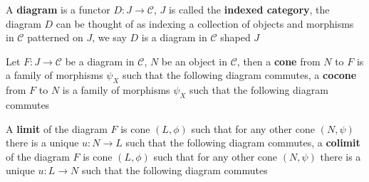 \documentclass[main]{subfiles}
\begin{document}
\begin{definition}
A \textbf{diagram} is a functor $D:J\to \mathscr C$, $J$ is called the \textbf{indexed category}, the diagram $D$ can be thought of as indexing a collection of objects and morphisms in $\mathscr C$ patterned on $J$, we say $D$ is a diagram in $\mathscr C$ shaped $J$ \par
Let $F:J\to\mathscr C$ be a diagram in $\mathscr C$, $N$ be an object in $\mathscr C$, then a \textbf{cone} from $N$ to $F$ is a family of morphisms $\psi_X$ such that the following diagram commutes, a \textbf{cocone} from $F$ to $N$ is a family of morphisms $\psi_X$ such that the following diagram commutes
\begin{center}
\end{center}
A \textbf{limit} of the diagram $F$ is cone $(L,\phi)$ such that for any other cone $(N,\psi)$ there is a unique $u:N\to L$ such that the following diagram commutes, a \textbf{colimit} of the diagram $F$ is cone $(L,\phi)$ such that for any other cone $(N,\psi)$ there is a unique $u:L\to N$ such that the following diagram commutes
\begin{center}
\end{center}
\end{definition}
\end{document}
